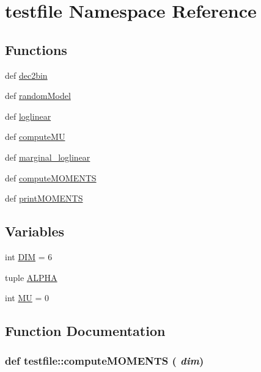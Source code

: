 \hypertarget{namespacetestfile}{
\section{testfile Namespace Reference}
\label{namespacetestfile}
}
\subsection*{Functions}
\begin{CompactItemize}
\item 
def \hyperlink{namespacetestfile_99113854298691c9eeb8a8898644a974}{dec2bin}
\item 
def \hyperlink{namespacetestfile_4072711694fcae0f9109bc45c7bb49ba}{randomModel}
\item 
def \hyperlink{namespacetestfile_3d8b61f805030ee5a2344dcd3c3c99c2}{loglinear}
\item 
def \hyperlink{namespacetestfile_9ca7719f709048d58857d39899d701de}{computeMU}
\item 
def \hyperlink{namespacetestfile_67f6cac6991933db387292d093863552}{marginal\_\-loglinear}
\item 
def \hyperlink{namespacetestfile_4d944ca85cf8ac83c850faaf02a61361}{computeMOMENTS}
\item 
def \hyperlink{namespacetestfile_bfa1bb5dd9c351ed90706ff1c941046d}{printMOMENTS}
\end{CompactItemize}
\subsection*{Variables}
\begin{CompactItemize}
\item 
int \hyperlink{namespacetestfile_91df5af6cb9c0d7b55401a5f33b65bd5}{DIM} = 6
\item 
tuple \hyperlink{namespacetestfile_1651280ab7e62f5b47d4526ce503f08e}{ALPHA}
\item 
int \hyperlink{namespacetestfile_a00aea5cbc11b484cdd7edce5d1c1807}{MU} = 0
\end{CompactItemize}


\subsection{Function Documentation}
\hypertarget{namespacetestfile_4d944ca85cf8ac83c850faaf02a61361}{
\subsubsection[{computeMOMENTS}]{\setlength{\rightskip}{0pt plus 5cm}def testfile::computeMOMENTS ( {\em dim})}}
\label{namespacetestfile_4d944ca85cf8ac83c850faaf02a61361}


